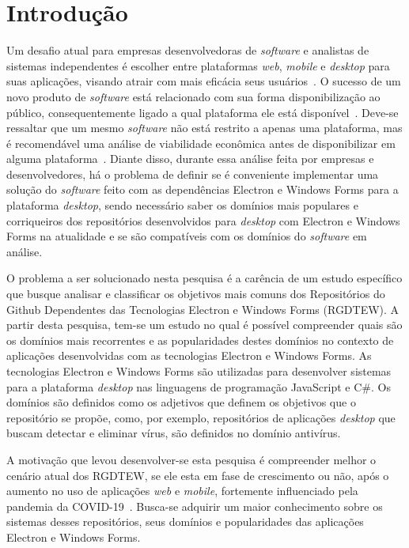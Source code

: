 \documentclass[12pt]{article}
\begin{document}
\section{Introdução} \label{introducao}

Um desafio atual para empresas desenvolvedoras de \textit{software} e analistas de sistemas independentes é escolher entre plataformas \textit{web}, \textit{mobile} e \textit{desktop} para suas aplicações, visando atrair com mais eficácia seus usuários~\cite{9463138}. O sucesso de um novo produto de \textit{software} está relacionado com sua forma disponibilização ao público, consequentemente ligado a qual plataforma ele está disponível~\cite{9463138}. Deve-se ressaltar que um mesmo \textit{software} não está restrito a apenas uma plataforma, mas é recomendável uma análise de viabilidade econômica antes de disponibilizar em alguma plataforma~\cite{Eke2019}. Diante disso, durante essa análise feita por empresas e desenvolvedores, há o problema de definir se é conveniente implementar uma solução do \textit{software} feito com as dependências Electron e Windows Forms para a plataforma \textit{desktop}, sendo necessário saber os domínios mais populares e corriqueiros dos repositórios desenvolvidos para \textit{desktop} com Electron e Windows Forms na atualidade e se são compatíveis com os domínios do \textit{software} em análise.

O problema a ser solucionado nesta pesquisa é a carência de um estudo específico que busque analisar e classificar os objetivos mais comuns dos Repositórios do Github Dependentes das Tecnologias Electron e Windows Forms (RGDTEW). A partir desta pesquisa, tem-se um estudo no qual é possível compreender quais são os domínios mais recorrentes e as popularidades destes domínios no contexto de aplicações desenvolvidas com as tecnologias Electron e Windows Forms. As tecnologias Electron e Windows Forms são utilizadas para desenvolver sistemas para a plataforma \textit{desktop} nas linguagens de programação JavaScript e C\#. Os domínios são definidos como os adjetivos que definem os objetivos que o repositório se propõe, como, por exemplo, repositórios de aplicações \textit{desktop} que buscam detectar e eliminar vírus, são definidos no domínio antivírus.

A motivação que levou desenvolver-se esta pesquisa é compreender melhor o cenário atual dos RGDTEW, se ele esta em fase de crescimento ou não, após o aumento no uso de aplicações \textit{web} e \textit{mobile}, fortemente influenciado pela pandemia da COVID-19~\cite{KATSUMATA2022100168}. Busca-se adquirir um maior conhecimento sobre os sistemas desses repositórios, seus domínios e popularidades das aplicações Electron e Windows Forms. 
\end{document}
